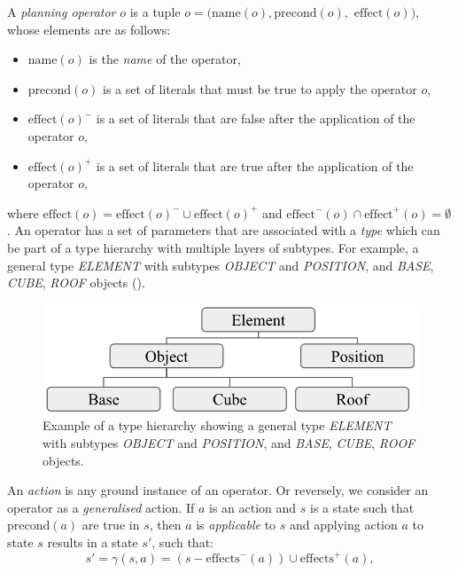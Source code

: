 \begin{definition}\label{def:operator}
A \textit{planning operator} $o$ is a tuple $o = (\text{name}(o), \text{precond}(o),$ $\text{effect}(o))$, whose elements are as follows:
\begin{itemize}
	\item $\text{name}(o)$ is the {\em name} of the operator,
	\item $\text{precond}(o)$ is a set of literals that must be true to apply the operator $o$,
	\item $\text{effect}(o)^{-}$ is a set of literals that are false after the application of the operator $o$,
	\item $\text{effect}(o)^{+}$ is a set of literals that are true after the application of the operator $o$,
\end{itemize}
\end{definition}
where $\text{effect}(o) = \text{effect}(o)^{-} \cup \text{effect}(o)^{+}$ and $\text{effect}^{-}(o) \cap \text{effect}^{+}(o) = \emptyset$. 
An operator has a set of parameters that are associated with a \textit{type} which can be part of a type hierarchy with multiple layers of subtypes.
For example, a general type \textit{ELEMENT} with subtypes \textit{OBJECT} and \textit{POSITION}, and \textit{BASE}, \textit{CUBE}, \textit{ROOF} objects ().

\begin{figure}[ht]
	\centering
	\includegraphics[width=0.7\linewidth]{figures/object-type-hierarchy}
	\caption{Example of a type hierarchy showing a general type \textit{ELEMENT} with subtypes \textit{OBJECT} and \textit{POSITION}, and \textit{BASE}, \textit{CUBE}, \textit{ROOF} objects.}
	\label{fig:object-type-hierarchy}
\end{figure}


\begin{definition}\label{def:action}
	An \textit{action} is any ground instance of an operator. Or reversely, we consider an operator as a \textit{generalised} action.
	If $a$ is an action and $s$ is a state such that $\text{precond}(a)$ are true in $s$, then $a$ is {\em applicable} to $s$ and applying action $a$ to state $s$ results in a state $s'$, such that:
	\begin{equation}\label{eq:statetrans}
		s' = \gamma(s, a) = (s - \text{effects}^{-}(a)) \cup \text{effects}^{+}(a),
	\end{equation}
	
\end{definition}

